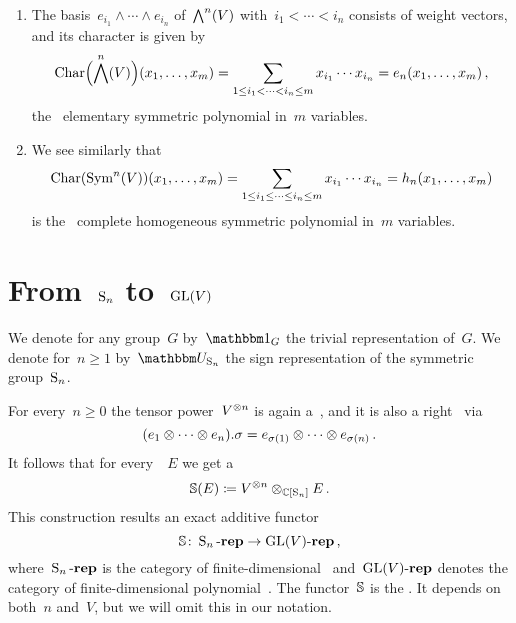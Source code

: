 \documentclass[a4paper,10pt]{scrartcl}
\begin{document}
\begin{example}
  \leavevmode
  \begin{enumerate}
    \item
      The basis~$e_{i_1} \wedge \dotsb \wedge e_{i_n}$ of~$\bigwedge^n(V)$ with~$i_1 < \dotsb < i_n$ consists of weight vectors, and its character is given by
      \[
        \operatorname{Char}\Bigl( \bigwedge^n(V) \Bigr)(x_1, \dotsc, x_m)
        =
        \sum_{1 \leq i_1 < \dotsb < i_n \leq m} x_{i_1} \dotsb x_{i_n}
        =
        e_n(x_1, \dotsc, x_m) \,,
      \]
      the~{} elementary symmetric polynomial in~$m$ variables.
    \item
      We see similarly that
      \[
        \operatorname{Char}(\operatorname{Sym}^n(V))(x_1, \dotsc, x_m)
        =
        \sum_{1 \leq i_1 \leq \dotsb \leq i_n \leq m} x_{i_1} \dotsb x_{i_n}
        =
        h_n(x_1, \dotsc, x_m)
      \]
      is the~{} complete homogeneous symmetric polynomial in~$m$ variables.
  \end{enumerate}
\end{example}





\section{From~$\operatorname{S}_n$ to~$\operatorname{GL}(V)$}

We denote for any group~$G$ by~$\trivrep_G$ the trivial representation of~$G$.
We denote for~$n \geq 1$ by~$\signrep_{\symm_n}$ the sign representation of the symmetric group~$\operatorname{S}_n$.

For every~$n \geq 0$ the tensor power~$V^{\otimes n}$ is again a~{}, and it is also a right~{} via
\[
  (e_1 \otimes \dotsb \otimes e_n) . \sigma
  =
  e_{\sigma(1)} \otimes \dotsb \otimes e_{\sigma(n)} \,.
\]
It follows that for every~{}~$E$ we get a~{}
\[
  \mathbb{S}(E)
  \coloneqq
  V^{\otimes n} \otimes_{\mathbb{C}[\operatorname{S}_n]} E \,.
\]
This construction results an exact additive functor
\[
  \mathbb{S}
  \colon
  \operatorname{S}_n\text{-}\mathbf{rep}
  \to
  \operatorname{GL}(V)\text{-}\mathbf{rep} \,,
\]
where~$\operatorname{S}_n\text{-}\mathbf{rep}$ is the category of finite-dimensional~{} and~$\operatorname{GL}(V)\text{-}\mathbf{rep}$ denotes the category of finite-dimensional polynomial~{}. 
The functor~$\mathbb{S}$ is the .
It depends on both~$n$ and~$V$, but we will omit this in our notation.
\end{document}
